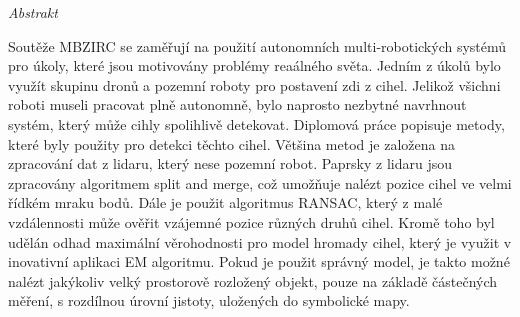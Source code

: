 \vfill
\begin{center}
{\it \large Abstrakt}
\vspace{0.2cm}

\begin{minipage}{0.8\textwidth}{
Soutěže MBZIRC se zaměřují na použití autonomních multi-robotických systémů pro úkoly, které jsou motivovány problémy reaálného světa. Jedním z úkolů bylo využít skupinu dronů a pozemní roboty pro postavení zdi z cihel. Jelikož všichni roboti museli pracovat plně autonomně, bylo naprosto nezbytné navrhnout systém, který může cihly spolihlivě detekovat. Diplomová práce popisuje metody, které byly použity pro detekci těchto cihel. Většina metod je založena na zpracování dat z lidaru, který nese pozemní robot. Paprsky z lidaru jsou zpracovány algoritmem split and merge, což umožňuje nalézt pozice cihel ve velmi řídkém mraku bodů. Dále je použit algoritmus RANSAC, který z malé vzdálennosti může ověřit vzájemné pozice různých druhů cihel. Kromě toho byl udělán odhad maximální věrohodnosti pro model hromady cihel, který je využit v inovativní aplikaci EM algoritmu. Pokud je použit správný model, je takto možné nalézt jakýkoliv velký prostorově rozložený objekt, pouze na základě částečných měření, s rozdílnou úrovní jistoty, uložených do symbolické mapy.
}
\end{minipage}
\end{center}
\vfill
\vspace{1cm}
\newpage{}
